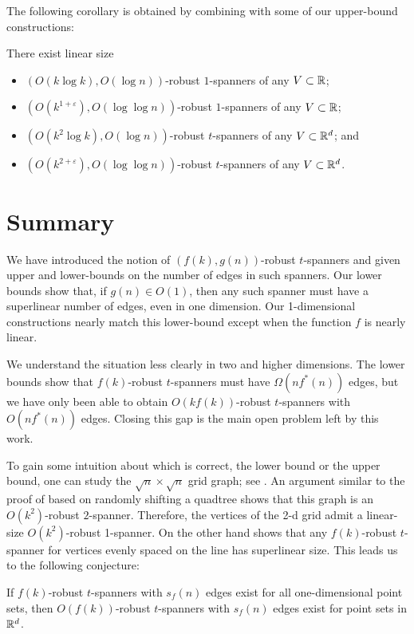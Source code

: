 \documentclass{patmorin}
\newcommand{\eps}{\varepsilon}
\begin{document}
The following corollary is obtained by combining 
with some of our upper-bound constructions:
\begin{cor}
  There exist linear size
  \begin{itemize}
    \item $(O(k\log k),O(\log n))$-robust $1$-spanners of any
      $V\subset \mathbb{R}$;
    \item $(O(k^{1+\eps}),O(\log\log n))$-robust $1$-spanners of any
      $V\subset \mathbb{R}$;
    \item $(O(k^2\log k), O(\log n))$-robust $t$-spanners of any
      $V\subset \mathbb{R}^d$; and
    \item $(O(k^{2+\eps}), O(\log\log n))$-robust $t$-spanners of any
      $V\subset \mathbb{R}^d$.
  \end{itemize}
\end{cor}

\section{Summary}

We have introduced the notion of $(f(k),g(n))$-robust $t$-spanners and
given upper and lower-bounds on the number of edges in such spanners.
Our lower bounds show that, if $g(n)\in O(1)$, then any such spanner
must have a superlinear number of edges, even in one dimension.
Our 1-dimensional constructions nearly match this lower-bound except
when the function $f$ is nearly linear.

We understand the situation less clearly in two and higher dimensions.
The lower bounds show that $f(k)$-robust $t$-spanners must have
$\Omega(nf^*(n))$ edges, but we have only been able to obtain
$O(kf(k))$-robust $t$-spanners with $O(nf^*(n))$ edges.  Closing this
gap is the main open problem left by this work.

To gain some intuition about which is correct, the lower bound or the
upper bound, one can study the $\sqrt{n}\times\sqrt{n}$ grid graph; see
.  An argument similar to the proof of 
based on randomly shifting a quadtree shows that this graph is an
$O(k^2)$-robust $2$-spanner.  Therefore, the vertices of the 2-d
grid admit a linear-size $O(k^2)$-robust 1-spanner.  On the other hand
 shows that any $f(k)$-robust $t$-spanner
for vertices evenly spaced on the line has superlinear size.
This leads us to the following conjecture:

\begin{conj}
If $f(k)$-robust $t$-spanners with $s_f(n)$ edges exist for all one-dimensional point sets, then $O(f(k))$-robust $t$-spanners with $s_f(n)$ edges exist for point sets in $\mathbb{R}^d$.
\end{conj}
\end{document}
